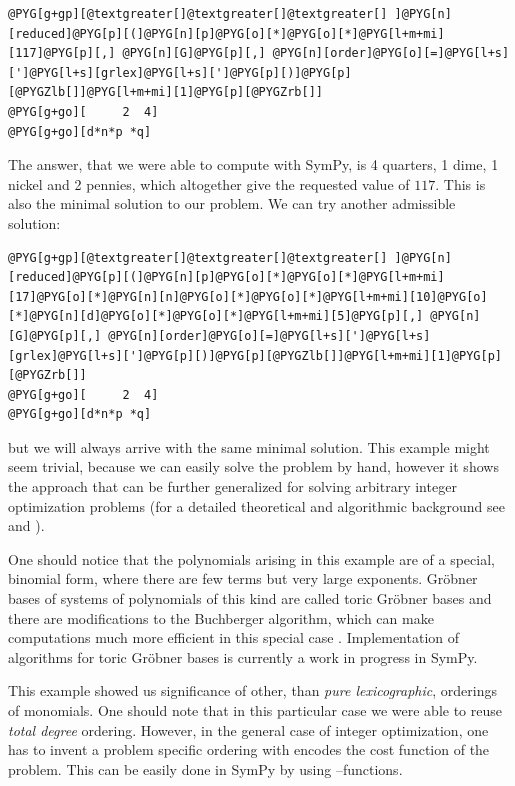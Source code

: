 \begin{Verbatim}[commandchars=@\[\]]
@PYG[g+gp][@textgreater[]@textgreater[]@textgreater[] ]@PYG[n][reduced]@PYG[p][(]@PYG[n][p]@PYG[o][*]@PYG[o][*]@PYG[l+m+mi][117]@PYG[p][,] @PYG[n][G]@PYG[p][,] @PYG[n][order]@PYG[o][=]@PYG[l+s][']@PYG[l+s][grlex]@PYG[l+s][']@PYG[p][)]@PYG[p][@PYGZlb[]]@PYG[l+m+mi][1]@PYG[p][@PYGZrb[]]
@PYG[g+go][     2  4]
@PYG[g+go][d*n*p *q]
\end{Verbatim}
\noindent
The answer, that we were able to compute with SymPy, is 4 quarters, 1 dime, 1 nickel and 2 pennies,
which altogether give the requested value of $117$. This is also the minimal solution to our problem.
We can try another admissible solution:

\begin{Verbatim}[commandchars=@\[\]]
@PYG[g+gp][@textgreater[]@textgreater[]@textgreater[] ]@PYG[n][reduced]@PYG[p][(]@PYG[n][p]@PYG[o][*]@PYG[o][*]@PYG[l+m+mi][17]@PYG[o][*]@PYG[n][n]@PYG[o][*]@PYG[o][*]@PYG[l+m+mi][10]@PYG[o][*]@PYG[n][d]@PYG[o][*]@PYG[o][*]@PYG[l+m+mi][5]@PYG[p][,] @PYG[n][G]@PYG[p][,] @PYG[n][order]@PYG[o][=]@PYG[l+s][']@PYG[l+s][grlex]@PYG[l+s][']@PYG[p][)]@PYG[p][@PYGZlb[]]@PYG[l+m+mi][1]@PYG[p][@PYGZrb[]]
@PYG[g+go][     2  4]
@PYG[g+go][d*n*p *q]
\end{Verbatim}
\noindent
but we will always arrive with the same minimal solution. This example might seem trivial, because we
can easily solve the problem by hand, however it shows the approach that can be further generalized for
solving arbitrary integer optimization problems (for a detailed theoretical and algorithmic background
see \cite{Sturmfels1996lectures} and \cite{Adams1994intro}).

One should notice that the polynomials arising in this example are of a special, binomial form, where
there are few terms but very large exponents. Gröbner bases of systems of polynomials of this kind
are called toric Gröbner bases and there are modifications to the Buchberger algorithm, which can
make computations much more efficient in this special case \cite{Traverso1991integer}. Implementation of
algorithms for toric Gröbner bases is currently a work in progress in SymPy.

This example showed us significance of other, than \emph{pure lexicographic}, orderings of monomials. One
should note that in this particular case we were able to reuse \emph{total degree} ordering. However, in
the general case of integer optimization, one has to invent a problem specific ordering with encodes
the cost function of the problem. This can be easily done in SymPy by using --functions.


